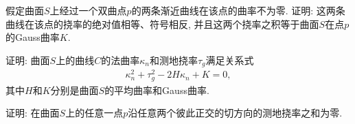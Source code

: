\documentclass[../../main.tex]{subfiles}%
\begin{document}
\begin{example}
假定曲面$S$上经过一个双曲点$p$的两条渐近曲线在该点的曲率不为零. 证明: 这两条曲线在该点的挠率的绝对值相等、符号相反, 并且这两个挠率之积等于曲面$S$在点$p$的Gauss曲率$K$.
\end{example}

\begin{example}
证明: 曲面$S$上的曲线$C$的法曲率$\kappa_n$和测地挠率$\tau_g$满足关系式
\begin{align*}
\kappa_n^2+\tau_g^2-2H\kappa_n+K=0,
\end{align*}
其中$H$和$K$分别是曲面$S$的平均曲率和Gauss曲率.
\end{example}

\begin{example}
证明: 在曲面$S$上的任意一点$p$沿任意两个彼此正交的切方向的测地挠率之和为零.
\end{example}
\end{document}
